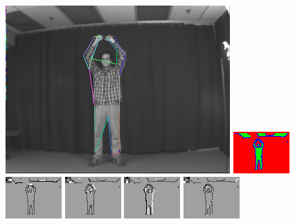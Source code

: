 \begin{figure}

\includegraphics[width=0.48 \linewidth]{output/2.detection/local_inference/out.s1.0090.d/thefinalparse.png}
\includegraphics[width=0.48 \linewidth]{output/2.detection/local_inference/out.s1.0090.d/local.x5.interior.png}
\includegraphics[width=0.24 \linewidth]{output/2.detection/local_inference/out.s1.0090.d/local.x5.orientations.0.png}
\includegraphics[width=0.24 \linewidth]{output/2.detection/local_inference/out.s1.0090.d/local.x5.orientations.1.png}
\includegraphics[width=0.24 \linewidth]{output/2.detection/local_inference/out.s1.0090.d/local.x5.orientations.2.png}
\includegraphics[width=0.24 \linewidth]{output/2.detection/local_inference/out.s1.0090.d/local.x5.orientations.3.png}


\end{figure}
